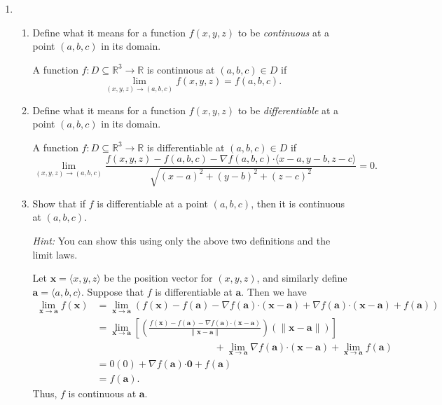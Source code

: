\documentclass[12pt]{article}
\newcommand{\points}[1]{\marginpar{\hspace{24pt}[#1]}}
\newcommand{\x}{\mathbf{x}}
\newcommand{\R}{\mathbb{R}}
\newcommand{\aaa}{\mathbf{a}}
\newcommand{\dotp}{\boldsymbol{\cdot}}
\begin{document}
\begin{enumerate}
\item \begin{enumerate}
\item Define what it means for a function $f(x,y,z)$ to be {\em continuous} at a point $(a,b,c)$ in its domain. \points{2}

\bigskip

A function $f:D\subseteq \R^3\to \R$ is continuous at $(a,b,c)\in D$ if 
\[
\lim_{(x,y,z)\to (a,b,c)}f(x,y,z) = f(a,b,c).
\]

\bigskip


\item Define what it means for a function $f(x,y,z)$ to be {\em differentiable} at a point $(a,b,c)$ in its domain. \points{3}

\bigskip

A function $f:D\subseteq \R^3\to \R$ is differentiable at $(a,b,c)\in D$ if
\[
\lim_{(x,y,z)\to (a,b,c)}\frac{f(x,y,z)-f(a,b,c)-\nabla f(a,b,c)\dotp \langle x-a, y-b, z- c\rangle}{\sqrt{(x-a)^2+(y-b)^2+(z-c)^2}}=0.
\]

\bigskip

\item Show that if $f$ is differentiable at a point $(a,b,c)$, then it is continuous at $(a,b,c)$.\points{5}

{\em Hint:} You can show this using only the above two definitions and the limit laws.

\bigskip

Let $\x=\langle x,y,z\rangle$ be the position vector for $(x,y,z)$, and similarly define $\aaa=\langle a,b,c\rangle$. Suppose that $f$ is differentiable at $\aaa$. Then we have
\begin{align*}
\lim_{\x\to\aaa}f(\x) & = \lim_{\x\to\aaa}\left(f(\x)-f(\aaa)-\nabla f(\aaa)\dotp (\x-\aaa) + \nabla f(\aaa)\dotp (\x-\aaa) + f(\aaa)\right)\\
& = \lim_{\x\to\aaa}\left[\left(\frac{f(\x)-f(\aaa)-\nabla f(\aaa)\dotp (\x-\aaa)}{\lVert \x-\aaa\rVert}\right)(\lVert \x-\aaa\rVert)\right]\\
& \hspace{2in} + \lim_{\x\to\aaa}\nabla f(\aaa)\dotp (\x-\aaa) + \lim_{\x\to\aaa}f(\aaa)\\
& = 0(0) + \nabla f(\aaa)\dotp \mathbf{0} +f(\aaa)\\
& = f(\aaa).
\end{align*}
Thus, $f$ is continuous at $\aaa$.
\end{enumerate}
\end{enumerate}
\end{document}
